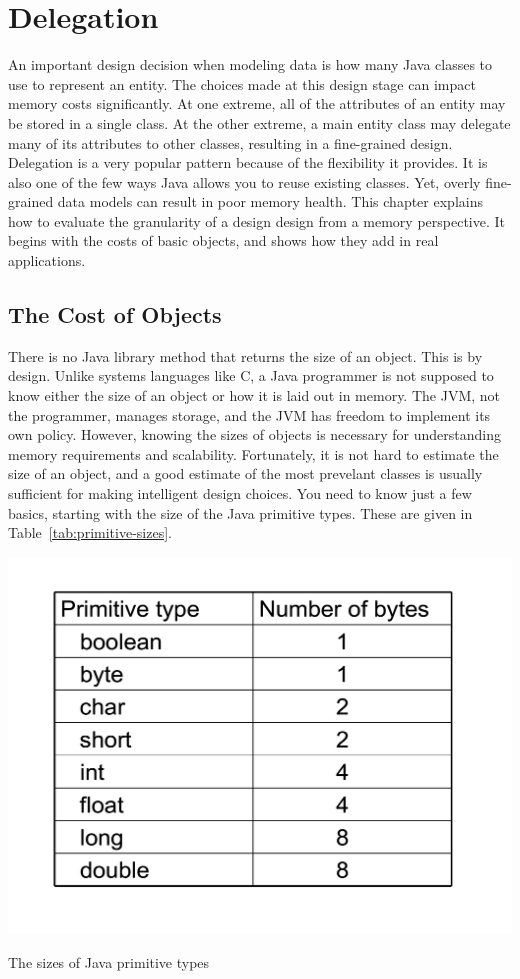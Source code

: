 \chapter{Delegation}

An important design decision when modeling data is how many Java classes to use to represent an entity. The choices made at this design stage can impact memory costs significantly. At one extreme, all of the attributes of an entity may be stored in a single class. At the other extreme, a main entity class may delegate many of its attributes to other classes, resulting in a fine-grained design. Delegation is a very popular pattern because of the flexibility it provides. It is also one of the few ways Java allows you to reuse existing classes. Yet, overly fine-grained data models can result in poor memory health. This chapter explains how to evaluate the granularity of a design design from a memory perspective. It begins with the costs of basic objects, and shows how they add in real applications.
  
\section{The Cost of Objects}
\label{sec:CostOfObjects}

There is no Java library method that returns the size of an object. This is by design. Unlike systems languages like C, a Java programmer is not supposed to know either the size of an object or how it is laid out in memory. The JVM, not the programmer, manages storage, and the JVM has freedom to implement its own policy. However, knowing the sizes of objects is necessary for understanding memory requirements and scalability. Fortunately, it is not hard to estimate the size of an object, and a good estimate of the most prevelant classes is usually sufficient for making intelligent design choices.  You need to know just a few basics, starting with the size of the Java primitive types. These are given in Table~\ref{tab:primitive-sizes}.
\begin{table}
  \centering
 \includegraphics[width=.50\textwidth]{Figures/chapter4/primitive-byte-sizes.pdf}
  \caption{The sizes of Java primitive types}
  \label{tab:primitive-sizes}
\end{table}

